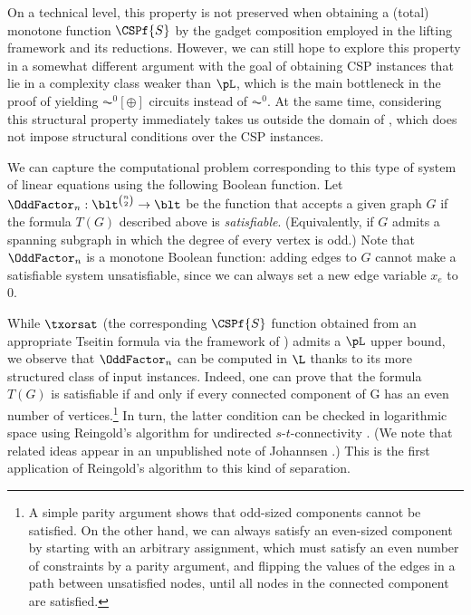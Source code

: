 \documentclass[11pt]{article}
\begin{document}
On a technical level, this property is not preserved when obtaining a (total) monotone function $\CSPf{S}$ by the gadget composition employed in the lifting framework and its reductions. However, we can still hope to explore this property in a somewhat different argument with the  goal of obtaining CSP instances that lie in a complexity class weaker than $\pL$, which is the main bottleneck in the proof of  yielding $\AC^0[\oplus]$ circuits instead of $\AC^0$. At the same time, considering this structural property immediately takes us outside the domain of , which does not impose structural conditions over the CSP instances.

We can capture the computational problem corresponding to this type of
system of linear equations using the following Boolean function. Let
$\OddFactor_n : \blt^{\binom{n}{2}} \to \blt$ be the function that accepts
a given graph $G$ if the formula $T(G)$ described above is
\emph{satisfiable}. (Equivalently, if $G$ admits a spanning subgraph in
which the degree of every vertex is odd.) Note that $\OddFactor_n$ is a
monotone Boolean function: adding edges to $G$ cannot make a satisfiable
system unsatisfiable, since we can always set a new edge variable $x_e$ to
$0$.

While $\txorsat$ (the corresponding $\CSPf{S}$ function obtained from an
appropriate Tseitin formula via the framework of \citep{gkrs19}) admits a
$\pL$ upper bound, we observe that $\OddFactor_n$ can be computed in $\L$
thanks to its more structured class of input instances. Indeed, one can
prove that the formula $T(G)$ is satisfiable if and only if every connected
component of G has an even number of vertices.\footnote{A simple parity
argument shows that odd-sized components cannot be satisfied. On the other
hand, we can always satisfy an even-sized component by starting with an
arbitrary assignment, which must satisfy an even number of constraints by a
parity argument, and flipping the values of the edges in a path between
unsatisfied nodes, until all nodes in the connected component are
satisfied.} In turn, the latter condition can be checked in logarithmic
space using Reingold's algorithm for undirected $s$-$t$-connectivity
\cite{DBLP:conf/stoc/Reingold05}. (We note that related ideas appear in an
unpublished note of Johannsen \cite{joh03}.)
This is the first application of Reingold's algorithm
to this kind of separation.
\end{document}

